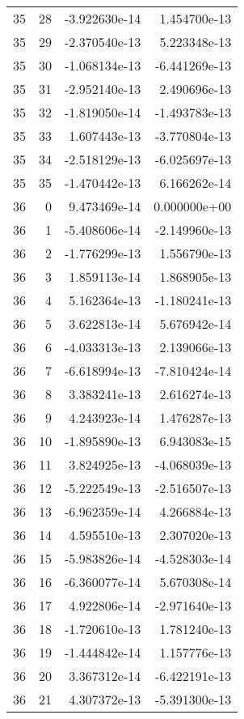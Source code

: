 \begin{tabular}{rrrr}
  35 &   28 & -3.922630e-14 &  1.454700e-13 \\
  35 &   29 & -2.370540e-13 &  5.223348e-13 \\
  35 &   30 & -1.068134e-13 & -6.441269e-13 \\
  35 &   31 & -2.952140e-13 &  2.490696e-13 \\
  35 &   32 & -1.819050e-14 & -1.493783e-13 \\
  35 &   33 &  1.607443e-13 & -3.770804e-13 \\
  35 &   34 & -2.518129e-13 & -6.025697e-13 \\
  35 &   35 & -1.470442e-13 &  6.166262e-14 \\
  36 &    0 &  9.473469e-14 &  0.000000e+00 \\
  36 &    1 & -5.408606e-14 & -2.149960e-13 \\
  36 &    2 & -1.776299e-13 &  1.556790e-13 \\
  36 &    3 &  1.859113e-14 &  1.868905e-13 \\
  36 &    4 &  5.162364e-13 & -1.180241e-13 \\
  36 &    5 &  3.622813e-14 &  5.676942e-14 \\
  36 &    6 & -4.033313e-13 &  2.139066e-13 \\
  36 &    7 & -6.618994e-13 & -7.810424e-14 \\
  36 &    8 &  3.383241e-13 &  2.616274e-13 \\
  36 &    9 &  4.243923e-14 &  1.476287e-13 \\
  36 &   10 & -1.895890e-13 &  6.943083e-15 \\
  36 &   11 &  3.824925e-13 & -4.068039e-13 \\
  36 &   12 & -5.222549e-13 & -2.516507e-13 \\
  36 &   13 & -6.962359e-14 &  4.266884e-13 \\
  36 &   14 &  4.595510e-13 &  2.307020e-13 \\
  36 &   15 & -5.983826e-14 & -4.528303e-14 \\
  36 &   16 & -6.360077e-14 &  5.670308e-14 \\
  36 &   17 &  4.922806e-14 & -2.971640e-13 \\
  36 &   18 & -1.720610e-13 &  1.781240e-13 \\
  36 &   19 & -1.444842e-14 &  1.157776e-13 \\
  36 &   20 &  3.367312e-14 & -6.422191e-13 \\
  36 &   21 &  4.307372e-13 & -5.391300e-13 \\

\end{tabular}
